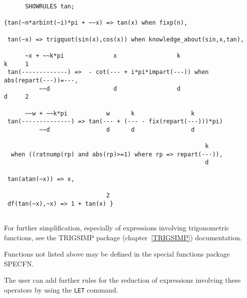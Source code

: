 \begin{verbatim}
      SHOWRULES tan;

{tan(~n*arbint(~i)*pi + ~~x) => tan(x) when fixp(n),

 tan(~x) => trigquot(sin(x),cos(x)) when knowledge_about(sin,x,tan),

      ~x + ~~k*pi              x                 k                     k     1
 tan(-------------) =>  - cot(--- + i*pi*impart(---)) when abs(repart(---))=---,
          ~~d                  d                 d                     d     2

      ~~w + ~~k*pi           w      k                k
 tan(--------------) => tan(--- + (--- - fix(repart(---)))*pi)
          ~~d                d      d                d

                                                         k
  when ((ratnump(rp) and abs(rp)>=1) where rp => repart(---)),
                                                         d

 tan(atan(~x)) => x,

                             2
 df(tan(~x),~x) => 1 + tan(x) }
			      
\end{verbatim}

For further simplification, especially of expressions involving
trigonometric functions, see the TRIGSIMP package
(chapter~\ref{TRIGSIMP}) documentation.

Functions not listed above may be defined in the special functions
package SPECFN.

The user can add further rules for the reduction of expressions involving
these operators by using the \texttt{LET} command.


